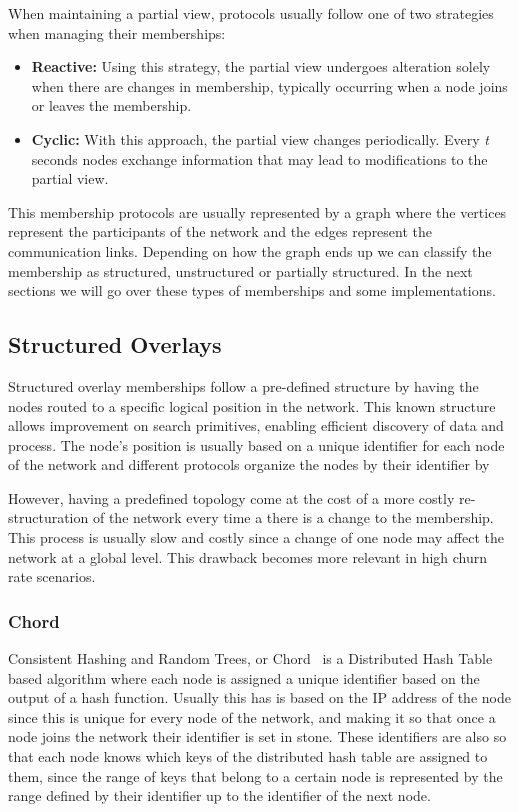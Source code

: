 When maintaining a partial view, protocols usually follow one of two strategies
when managing their memberships:

\begin{itemize}
  \item \textbf{Reactive:} Using this strategy, the partial view undergoes alteration solely
when there are changes in membership, typically occurring when a node joins or leaves the membership.
  \item \textbf{Cyclic:} With this approach, the partial view changes periodically.
Every \textit{t} seconds nodes exchange information that may lead to modifications to the
partial view.
\end{itemize}

This membership protocols are usually represented by a graph where the vertices represent
the participants of the network and the edges represent the communication links.
Depending on how the graph ends up we can classify the membership as structured,
unstructured or partially structured. In the next sections we will go over these
types of memberships and some implementations.

\subsection{Structured Overlays}\label{sub:structured_overlays}

Structured overlay memberships follow a pre-defined structure by having the nodes
routed to a specific logical position in the network. This known structure allows
improvement on search primitives, enabling efficient discovery of data and process.
The node's position is usually based on a unique identifier for each node of the
network and different protocols organize the nodes by their identifier by 

However, having a predefined topology come at the cost of a more costly re-structuration
of the network every time a there is a change to the membership. This process
is usually slow and costly since a change of one node may affect
the network at a global level. This drawback becomes more relevant in high churn rate
scenarios.

\subsubsection{Chord}\label{subsec:chord}

Consistent Hashing and Random Trees, or Chord~\cite{chord} is a Distributed Hash
Table based algorithm where each node is assigned a unique identifier based on
the output of a hash function. Usually this has is based on the IP address of
the node since this is unique for every node of the network, and making it so
that once a node joins the network their identifier is set in stone. These
identifiers are also so that each node knows which keys of the distributed hash
table are assigned to them, since the range of keys that belong to a certain
node is represented by the range defined by their identifier up to the
identifier of the next node.

